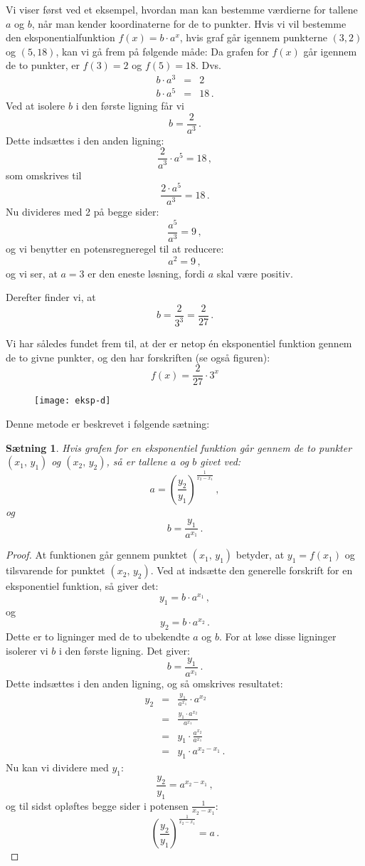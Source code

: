 \documentclass[12pt,oneside,a4paper]{article}
\newcommand{\bas}{\begin{eqnarray*}}
\newcommand{\eas}{\end{eqnarray*}}
\theoremstyle{plain}
\newtheorem*{thm}{Sætning}
\begin{document}
Vi viser først ved et eksempel, hvordan man kan bestemme værdierne for tallene
$a$ og $b$, når man kender koordinaterne for de to punkter.  Hvis vi vil
bestemme den eksponentialfunktion $f(x) = b\cdot a^x$, hvis graf går igennem
punkterne $(3, 2)$ og $(5, 18)$, kan vi gå frem på følgende måde: Da grafen for
$f(x)$ går igennem de to punkter, er $f(3) = 2$ og $f(5) = 18$. Dvs.
\bas
b \cdot a^3  &=& 2\\
b \cdot a^5  &=& 18 \,.
\eas
Ved at isolere $b$ i den første ligning får vi
$$
b = \frac{2}{a^3} \,.
$$
Dette indsættes i den anden ligning:
$$
\frac{2}{a^3} \cdot a^5 = 18 \,,
$$
som omskrives til
$$
\frac{2 \cdot a^5}{a^3} = 18 \,.
$$
Nu divideres med 2 på begge sider:
$$
\frac{a^5}{a^3} = 9 \,,
$$
og vi benytter en potensregneregel til at reducere:
$$
a^2 = 9 \,,
$$
og vi ser, at $a=3$ er den eneste løsning, fordi $a$ skal være positiv.

Derefter finder vi, at 
$$
b = \frac{2}{3^3} = \frac{2}{27} \,.
$$

Vi har således fundet frem til, at der er netop én eksponentiel funktion gennem
de to givne punkter, og den har forskriften (se også figuren):
$$
f(x) = \frac{2}{27} \cdot 3^x
$$

\begin{figure}[ht]
    \centering
    \texttt{[image: eksp-d]}
    \label{eksp-d}
\end{figure}

Denne metode er beskrevet i følgende sætning:

\begin{thm}
    Hvis grafen for en eksponentiel funktion går gennem de to punkter $(x_1,
    \,y_1)$ og $(x_2, \,y_2)$, så er tallene $a$ og $b$ givet ved:
    $$
    a = \left(\frac{y_2}{y_1}\right)^{\frac{1}{x_2-x_1}}\,,
    $$
    og
    $$
    b = \frac{y_1}{a^{x_1}}\,.
    $$
\end{thm}
\begin{proof}
    At funktionen går gennem punktet $(x_1, \,y_1)$ betyder, at $y_1 = f(x_1)$
    og tilsvarende for punktet $(x_2,\,y_2)$. Ved at indsætte den generelle
    forskrift for en eksponentiel funktion, så giver det:
    $$
    y_1 = b\cdot a^{x_1}\,,
    $$
    og 
    $$
    y_2 = b \cdot a^{x_2}\,.
    $$
    Dette er to ligninger med de to ubekendte $a$ og $b$. For at løse disse ligninger
    isolerer vi $b$ i den første ligning. Det giver:
    $$
    b = \frac{y_1}{a^{x_1}}\,.
    $$
    Dette indsættes i den anden ligning, og så omskrives resultatet:
    \bas
    y_2 &=& \frac{y_1}{a^{x_1}} \cdot a^{x_2} \\
    &=& \frac{y_1 \cdot a^{x_2}}{a^{x_1}} \\
    &=& y_1 \cdot \frac{a^{x_2}}{a^{x_1}} \\
    &=& y_1 \cdot a^{x_2-x_1}\,.
    \eas
    Nu kan vi dividere med $y_1$:
    $$
    \frac{y_2}{y_1} = a^{x_2-x_1}\,,
    $$
    og til sidst opløftes begge sider i potensen $\frac{1}{x_2-x_1}$:
    $$
    \left(\frac{y_2}{y_1}\right)^{\frac{1}{x_2-x_1}} = a\,.
    $$
\end{proof}
\end{document}
